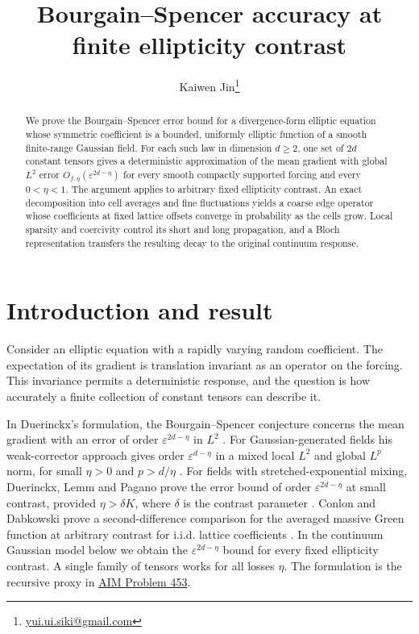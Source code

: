 \documentclass[11pt]{article}
\title{Bourgain--Spencer accuracy at finite ellipticity contrast}
\author{Kaiwen Jin\thanks{\href{mailto:yui.ui.siki@gmail.com}{yui.ui.siki@gmail.com}}}
\date{}
\begin{document}
\maketitle

\begin{abstract}
We prove the Bourgain--Spencer error bound for a divergence-form elliptic equation whose symmetric coefficient is a bounded, uniformly elliptic function of a smooth finite-range Gaussian field. For each such law in dimension \(d\ge2\), one set of \(2d\) constant tensors gives a deterministic approximation of the mean gradient with global \(L^2\) error \(O_{f,\eta}(\varepsilon^{2d-\eta})\) for every smooth compactly supported forcing and every \(0<\eta<1\). The argument applies to arbitrary fixed ellipticity contrast. An exact decomposition into cell averages and fine fluctuations yields a coarse edge operator whose coefficients at fixed lattice offsets converge in probability as the cells grow. Local sparsity and coercivity control its short and long propagation, and a Bloch representation transfers the resulting decay to the original continuum response.
\end{abstract}

\section{Introduction and result}\label{sec:introduction}
Consider an elliptic equation with a rapidly varying random coefficient. The expectation of its gradient is translation invariant as an operator on the forcing. This invariance permits a deterministic response, and the question is how accurately a finite collection of constant tensors can describe it.

In Duerinckx's formulation, the Bourgain--Spencer conjecture concerns the mean gradient with an error of order \(\varepsilon^{2d-\eta}\) in \(L^2\) \cite[Conjecture 1]{Duerinckx}. For Gaussian-generated fields his weak-corrector approach gives order \(\varepsilon^{d-\eta}\) in a mixed local \(L^2\) and global \(L^p\) norm, for small \(\eta>0\) and \(p>d/\eta\) \cite[Theorem 2]{Duerinckx}. For fields with stretched-exponential mixing, Duerinckx, Lemm and Pagano prove the error bound of order \(\varepsilon^{2d-\eta}\) at small contrast, provided \(\eta>\delta K\), where \(\delta\) is the contrast parameter \cite[Corollary 3.6(i) and Remark 2.3]{DLP}. Conlon and Dabkowski prove a second-difference comparison for the averaged massive Green function at arbitrary contrast for i.i.d. lattice coefficients \cite[Theorem 1.1]{ConlonDabkowski}. In the continuum Gaussian model below we obtain the \(\varepsilon^{2d-\eta}\) bound for every fixed ellipticity contrast. A single family of tensors works for all losses \(\eta\). The formulation is the recursive proxy in \href{https://github.com/MColbrook/AIM/blob/b2ec0fac559f532fc0ed04fce81deea0ce07c68b/problems/453-bourgain-spencer-nonperturbative-homogenization.md}{AIM Problem 453}.
\end{document}
